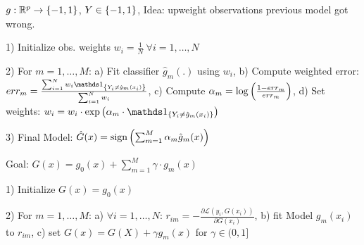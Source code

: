 \vspace{5pt}

 $g: \mathbb{R}^p \rightarrow \left\{ -1,1 \right\}$, $Y \in \left\{ -1,1 \right\}$, Idea: upweight observations previous model got wrong.

1) Initialize obs. weights $w_i = \frac{1}{N} \ \forall i=1,\dots,N$

2) For $m=1,\dots,M$: a) Fit classifier $\hat{g}_m (.)$ using $w_i$, b) Compute weighted error: $err_m = \frac{\sum_{i=1}^N w_i \id_{\geschwungeneklammer{Y_i \neq \hat{g}_m (x_i)}}}{\sum_{i=1}^N w_i}$, c) Compute $\alpha
_m = \log \left( \frac{1-err_m}{err_m} \right)$, d) Set weights: $w_i = w_i \cdot \exp \klammer{\alpha_m \cdot \id_{\geschwungeneklammer{Y_i \neq \hat{g}_m (x_i)}}}$

3) Final Model: $\hat{G} (x) = \text{sign} \left( \sum_{m=1}^M \alpha_m \hat{g}_m (x) \right)$

\vspace{5pt}

Goal: $G(x) = g_0 (x) + \sum_{m=1}^M \gamma \cdot g_m(x)$

1) Initialize $G(x) = g_0 (x)$

2) For $m=1,\dots,M$: a) $\forall i=1,\dots,N$: $r_{im} = - \frac{\partial \mathcal{L} (y_i,G(x_i))}{\partial G(x_i)}$, b) fit Model $g_m (x_i)$ to $r_{im}$, c) set $G(x) = G(X) + \gamma g_m(x)$ for $\gamma \in (0,1]$
